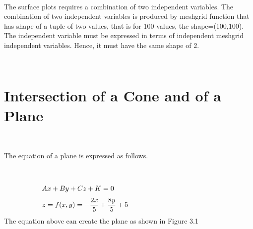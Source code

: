 \documentclass[10pt,a4paper,leqno]{article}
\begin{document}
\begin{CJK*}{UTF8}{gbsn}
 \par \ \par\noindent The surface plots requires a combination of two independent variables. The combination of two independent variables is produced by meshgrid function that has shape of a tuple of two values, that is for 100 values, the shape=(100,100). The independent variable must be expressed in terms of independent meshgrid independent variables. Hence, it must have the same shape of 2.
 \par \ \par\noindent \section{Intersection of a Cone and of a Plane}
 \par \ \par\noindent The equation of a plane is expressed as follows.
 \par \ \par\begin{equation}
 \begin{minipage}{250pt}
                \begin{flushleft} $\displaystyle A x + B y + C z + K = 0$  \end{flushleft}
 \end{minipage}
 \end{equation}
\begin{equation}
 \begin{minipage}{250pt}
                \begin{flushleft} $\displaystyle z = f{\left(x,y \right)} = - \frac{2 x}{5} + \frac{8 y}{5} + 5$  \end{flushleft}
 \end{minipage}
 \end{equation}
\noindent The equation above can create the plane as shown in Figure 3.1
 \par \ \par\begin{figure}[H]

\end{figure}
\end{CJK*}
\end{document}
